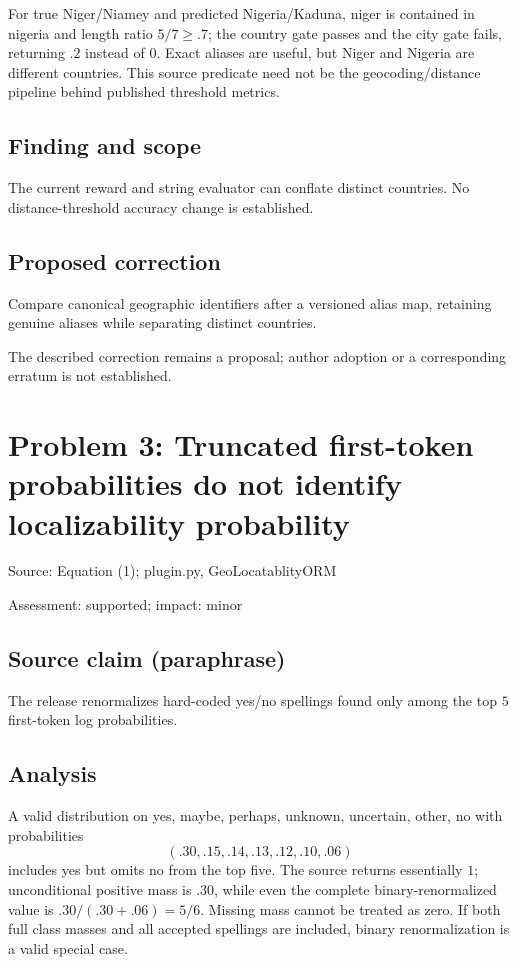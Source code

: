 \documentclass[11pt]{article}
\begin{document}
For true Niger/Niamey and predicted Nigeria/Kaduna, niger is contained in nigeria and length ratio \(5/7\ge.7\); the country gate passes and the city gate fails, returning \(.2\) instead of \(0\). Exact aliases are useful, but Niger and Nigeria are different countries. This source predicate need not be the geocoding/distance pipeline behind published threshold metrics.

\subsection*{Finding and scope}

The current reward and string evaluator can conflate distinct countries. No distance-threshold accuracy change is established.

\subsection*{Proposed correction}

Compare canonical geographic identifiers after a versioned alias map, retaining genuine aliases while separating distinct countries.

The described correction remains a proposal; author adoption or a corresponding erratum is not established.

\section*{Problem 3: Truncated first-token probabilities do not identify localizability probability}

Source: Equation (1); plugin.py, GeoLocatablityORM

Assessment: supported; impact: minor

\subsection*{Source claim (paraphrase)}

The release renormalizes hard-coded yes/no spellings found only among the top \(5\) first-token log probabilities.

\subsection*{Analysis}

A valid distribution on yes, maybe, perhaps, unknown, uncertain, other, no with probabilities \[(.30,.15,.14,.13,.12,.10,.06)\] includes yes but omits no from the top five. The source returns essentially \(1\); unconditional positive mass is \(.30\), while even the complete binary-renormalized value is \(.30/(.30+.06)=5/6\). Missing mass cannot be treated as zero. If both full class masses and all accepted spellings are included, binary renormalization is a valid special case.
\end{document}
